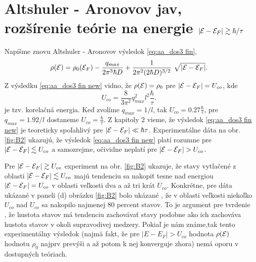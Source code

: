 \section{Altshuler - Aronovov jav, rozšírenie teórie na energie $|\mathcal{E} - \mathcal{E}_F| \gtrsim \hbar/\tau$}
Napíšme znovu Altshuler - Aronovov výsledok \eqref{eq:aa_dos3 fin},
\begin{equation}
 \label{eq:aa_dos3 fin new}
 \rho(\E)=\rho_0(\E_F) - \frac{q_{max}}{2\pi^3 \hbar D}
 +    \frac{1}{2\pi^2 (2\hbar D)^{3/2}}  \ \sqrt{|\E-\E_F|}  \text{.}
\end{equation}
Z výsledku \eqref{eq:aa_dos3 fin new} vidno, že $\rho(\mathcal{E}) = \rho_0$ pre $|\mathcal{E}-\mathcal{E}_F| =  U_{co}$,
kde
\begin{equation}
\label{eq:aa_U co korelenergia}
 U_{co} = \frac{8}{3\pi^{2}} q_{max}^2 l^2 \frac{\hbar}{\tau} \text{.}
\end{equation}
je tzv. korelačná energia. Keď zvolíme  $q_{max} =  1/l$, tak
$U_{co} = 0.27 \frac{\hbar}{\tau}$, pre $q_{max} =  1.92/l$ dostaneme $U_{co} = \frac{\hbar}{\tau}$. Z kapitoly 2 vieme, že
výsledok  \eqref{eq:aa_dos3 fin new} je teoreticky spoľahlivý pre $|\mathcal{E}-\mathcal{E}_F| \ll  {\hbar}{\tau}$. Experimentálne dáta na obr. \ref{fig:B2}
ukazujú, že výsledok  \eqref{eq:aa_dos3 fin new} platí rozumne pre  $|\mathcal{E}-\mathcal{E}_F| \lesssim  U_{co}$ a samozrejme, očividne neplatí pre $|\mathcal{E}-\mathcal{E}_F| > U_{co}$.

Pre $|\mathcal{E}-\mathcal{E}_F| \gtrsim  U_{co}$ experiment
na obr. \ref{fig:B2} ukazuje, že stavy vytlačené z oblasti $|\mathcal{E}-\mathcal{E}_F| \lesssim  U_{co}$ majú tendenciu sa nakopiť tesne
nad energiou $|\mathcal{E}-\mathcal{E}_F| =  U_{co}$ v oblasti veľkosti dva a až tri krát $U_{co}$.  Konkrétne, pre dáta ukázané v paneli (d) obrázku \ref{fig:B2} bolo ukázané \cite{Mazur}, že
v oblasti veľkosti niekoľko $U_{co}$ nad $U_{co}$ sa nakopilo najmenej $80$ percent stavov. To je argument pre tvrdenie \cite{Mazur}, že hustota stavov má tendenciu zachovávať stavy
podobne ako ich zachováva hustota stavov v okoli supravodivej medzery. Pokiaľ je nám známe,tak tento experimentálny výsledok (najmä fakt, že  pre $|E-E_F| > U_{co}$ hodnota $\rho(\mathcal{E})$ hodnotu $\rho_0$
najprv prevýši a až potom k nej konverguje zhora) nemá oporu v dostupných teóriach.

